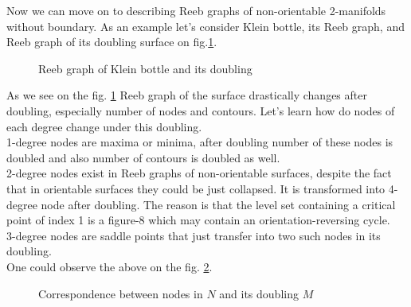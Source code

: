 \documentclass[]{article}
\begin{document}
Now we can move on to describing Reeb graphs of non-orientable 2-manifolds without boundary. As an example let's consider Klein bottle, its Reeb graph, and Reeb graph of its doubling surface on fig.\ref{fig:Klein}. \\
\begin{figure}[h!]
\caption{Reeb graph of Klein bottle and its doubling}
\label{fig:Klein}
\end{figure}
As we see on the fig. \ref{fig:Klein} Reeb graph of the surface drastically changes after doubling, especially number of nodes and contours.  Let's learn how do nodes of each degree change under this doubling. \\
1-degree nodes are maxima or minima, after doubling number of these nodes is doubled and also number of contours is doubled as well. \\
2-degree nodes exist in Reeb graphs of non-orientable surfaces, despite the fact that in orientable surfaces they could be just collapsed. It is transformed into 4-degree node after doubling. The reason is that the level set containing a critical point of index 1 is a figure-8 which may contain an orientation-reversing cycle. \\
3-degree nodes are saddle points that just transfer into two such nodes in its doubling. \\
One could observe the above on the fig. \ref{fig:Nodes}.  
\begin{figure}[h!]
\caption{Correspondence between nodes in $N$ and its doubling $M$}
\label{fig:Nodes}
\end{figure}
\end{document}
